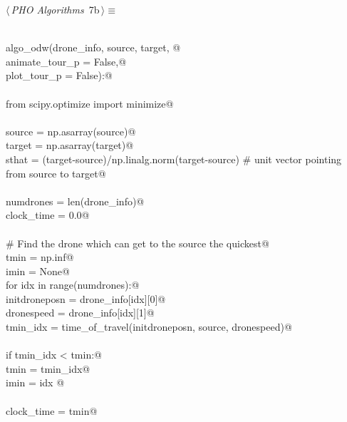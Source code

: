 \documentclass[10.0pt]{report}
\begin{document}
\begin{flushleft} \small\label{scrap3}\raggedright\small
{} $\langle\,${\itshape PHO Algorithms}\nobreak\ {\footnotesize {7b}}$\,\rangle\equiv$
\vspace{-1ex}
\begin{list}{}{} \item
\mbox{}\verb@@\\
\mbox{}\verb@def algo_odw(drone_info, source, target, @\\
\mbox{}\verb@             animate_tour_p = False,@\\
\mbox{}\verb@             plot_tour_p    = False):@\\
\mbox{}\verb@@\\
\mbox{}\verb@    from scipy.optimize import minimize@\\
\mbox{}\verb@@\\
\mbox{}\verb@    source = np.asarray(source)@\\
\mbox{}\verb@    target = np.asarray(target)@\\
\mbox{}\verb@    sthat  = (target-source)/np.linalg.norm(target-source) # unit vector pointing from source to target@\\
\mbox{}\verb@@\\
\mbox{}\verb@    numdrones  = len(drone_info)@\\
\mbox{}\verb@    clock_time = 0.0@\\
\mbox{}\verb@@\\
\mbox{}\verb@    # Find the drone which can get to the source the quickest@\\
\mbox{}\verb@    tmin = np.inf@\\
\mbox{}\verb@    imin = None@\\
\mbox{}\verb@    for idx in range(numdrones):@\\
\mbox{}\verb@         initdroneposn = drone_info[idx][0]@\\
\mbox{}\verb@         dronespeed    = drone_info[idx][1]@\\
\mbox{}\verb@         tmin_idx = time_of_travel(initdroneposn, source, dronespeed)@\\
\mbox{}\verb@@\\
\mbox{}\verb@         if tmin_idx < tmin:@\\
\mbox{}\verb@             tmin = tmin_idx@\\
\mbox{}\verb@             imin = idx @\\
\mbox{}\verb@@\\
\mbox{}\verb@    clock_time = tmin@\\

\end{list}
\end{flushleft}
\end{document}
